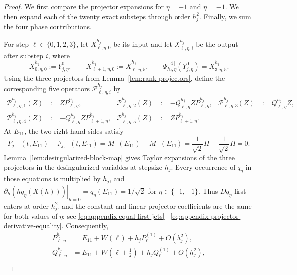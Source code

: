 \documentclass[]{article}
\numberwithin{equation}{section}
\theoremstyle{plain}
\theoremstyle{remark}
\begin{document}
\begin{proof}
We first compare the projector expansions for $\eta=+1$ and $\eta=-1$.
We then expand each of the twenty exact substeps through order $h_j^2$.
Finally, we sum the four phase contributions.

For step $\ell\in\{0,1,2,3\}$, let
$X^{h_j}_{\ell,\eta,0}$ be its input and let
$X^{h_j}_{\ell,\eta,i}$ be the output after substep $i$, where
\begin{equation}\label{eq:twenty-state-chain}
 X^{h_j}_{0,\eta,0}:=Y_{j,\eta}^0,
 \qquad X^{h_j}_{\ell+1,\eta,0}:=X^{h_j}_{\ell,\eta,5},
 \qquad
 \Psi^{[4]}_{h_j,\eta}(Y_{j,\eta}^0)=X^{h_j}_{3,\eta,5}.
\end{equation}
Using the three projectors from Lemma~\ref{lem:rank-projectors}, define
the corresponding five operators $\mathcal P^{h_j}_{\ell,\eta,i}$ by
\begin{equation}\label{eq:actual-five-actions}
\begin{aligned}
 \mathcal P^{h_j}_{\ell,\eta,1}(Z)&:=ZP^{h_j}_{\ell,\eta},
 &\mathcal P^{h_j}_{\ell,\eta,2}(Z)&:=-Q^{h_j}_{\ell,\eta}ZP^{h_j}_{\ell,\eta},
 &\mathcal P^{h_j}_{\ell,\eta,3}(Z)&:=Q^{h_j}_{\ell,\eta}Z,\\
 \mathcal P^{h_j}_{\ell,\eta,4}(Z)&:=-Q^{h_j}_{\ell,\eta}ZP^{h_j}_{\ell+1,\eta},
 &\mathcal P^{h_j}_{\ell,\eta,5}(Z)&:=ZP^{h_j}_{\ell+1,\eta}.
\end{aligned}
\end{equation}
At $E_{11}$, the two right-hand sides satisfy
\begin{equation}\label{eq:base-field-difference}
 F_{j,+}(t,E_{11})-F_{j,-}(t,E_{11})
 =M_+(E_{11})-M_-(E_{11})
 =\frac1{\sqrt2}H-\frac1{\sqrt2}H=0.
\end{equation}
Lemma~\ref{lem:desingularized-block-map} gives Taylor expansions of the
three projectors in the desingularized variables at stepsize $h_j$.
Every occurrence of $q_\eta$ in those equations is multiplied by $h_j$,
and
$\left.\partial_h(hq_\eta(X(h)))\right|_{h=0}
=q_\eta(E_{11})=1/\sqrt2$ for $\eta\in\{+1,-1\}$.
Thus $Dq_\eta$ first enters at order $h_j^2$, and the constant and linear
projector coefficients are the same for both values of $\eta$; see
\eqref{eq:appendix-equal-first-jets}--
\eqref{eq:appendix-projector-derivative-equality}.  Consequently,
\begin{align*}
 P^{h_j}_{\ell,\eta}
 &=E_{11}+W(\ell)+h_jP^{(1)}_{\ell}+O(h_j^2),\\
 Q^{h_j}_{\ell,\eta}
 &=E_{11}+W(\ell+\tfrac12)+h_jQ^{(1)}_{\ell}+O(h_j^2),\\

\end{align*}
\end{proof}
\end{document}
